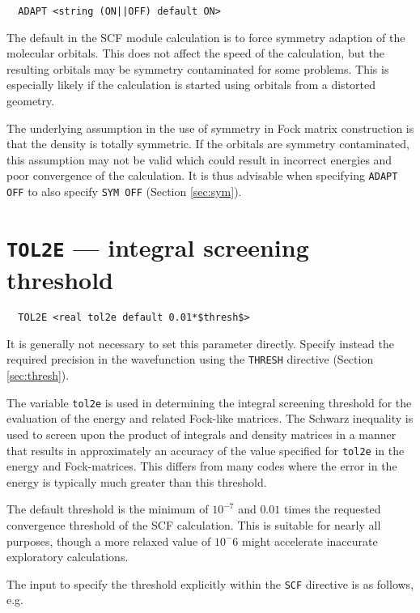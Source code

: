 \begin{verbatim}
  ADAPT <string (ON||OFF) default ON>
\end{verbatim}

The default in the SCF module calculation is to force symmetry
adaption of the molecular orbitals. This does not affect the speed of
the calculation, but the resulting orbitals may be symmetry
contaminated for some problems.  This is especially likely if the
calculation is started using orbitals from a distorted geometry.

The underlying assumption in the use of symmetry in Fock matrix
construction is that the density is totally symmetric.  If the orbitals
are symmetry contaminated, this assumption may not be valid which
could result in incorrect energies and poor convergence of the
calculation.  It is thus advisable when specifying \verb+ADAPT OFF+ to
also specify \verb+SYM OFF+ (Section \ref{sec:sym}).

\section{{\tt TOL2E} --- integral screening threshold}
\label{sec:tol2e}

\begin{verbatim}
  TOL2E <real tol2e default 0.01*$thresh$>
\end{verbatim}

It is generally not necessary to set this parameter directly.  Specify
instead the required precision in the wavefunction using the
\verb+THRESH+ directive (Section \ref{sec:thresh}).

The variable \verb+tol2e+ is used in determining the integral
screening threshold for the evaluation of the energy and related
Fock-like matrices.  The Schwarz inequality is used to screen upon the
product of integrals and density matrices in a manner that results in
approximately an accuracy of the value specified for \verb+tol2e+ in
the energy and Fock-matrices.  This differs from many codes where the
error in the energy is typically much greater than this threshold.

The default threshold is the minimum of $10^{-7}$ and $0.01$ times the
requested convergence threshold of the SCF calculation.  This is
suitable for nearly all purposes, though a more relaxed value of 
$10^-6$ might accelerate inaccurate exploratory calculations.

The input to specify the threshold explicitly within the
\verb+SCF+ directive is as follows, e.g.

